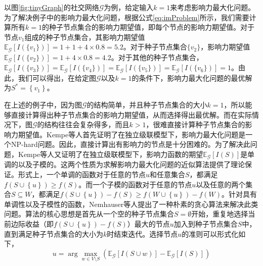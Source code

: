 以图\ref{fig:tinyGraph}的社交网络$\mathcal{G}$为例，给定输入$k=1$来考虑影响力最大化问题。为了解决例子中的影响力最大化问题，根据公式\ref{eq:imProblem}所示，我们需要计算所有$k=1$的种子节点集合的影响力期望值，即每个节点的影响力期望值。对于节点$v_1$组成的种子节点集合，其影响力期望值$\mathbb{E}_\mathcal{G}\left[I\left(\{v_1\}\right)\right]=1+1+4\times0.8=5.2$。对于种子节点集合$\{v_2\}$，影响力期望值$\mathbb{E}_\mathcal{G}\left[I\left(\{v_2\}\right)\right]=1+4\times0.8=4.2$。对于其他的种子节点集合，$\mathbb{E}_\mathcal{G}\left[I\left(\{v_3\}\right)\right]=
\mathbb{E}_\mathcal{G}\left[I\left(\{v_4\}\right)\right]=
\mathbb{E}_\mathcal{G}\left[I\left(\{v_5\}\right)\right]=
\mathbb{E}_\mathcal{G}\left[I\left(\{v_6\}\right)\right]=1$。由此，我们可以得出，在给定图$\mathcal{G}$以及$k=1$的条件下，影响力最大化问题的最优解为$S^\ast=\left\{v_1\right\}$。

在上述的例子中，因为图$\mathcal{G}$的结构简单，并且种子节点集合的大小$k=1$，所以能够直接计算得出种子节点集合的影响力期望值，从而选择得出最优解。而在实际情况下，图$\mathcal{G}$的结构往往会复杂得多，而且$k>1$，很难直接计算种子节点集合的影响力期望值。Kempe等人首先证明了在独立级联模型下，影响力最大化问题是一个NP-hard问题。因此，直接计算出有影响力的节点是十分困难的。为了解决此问题，Kempe等人又证明了在独立级联模型下，影响力函数的期望$\mathbb{E}_\mathcal{G}\left[I\left(S\right)\right]$是单调的以及子模的。这两个性质为求解影响力最大化问题的近似算法提供了理论保证。形式上，一个单调的函数对于任意的节点$u$和任意集合$S$，都满足$f\left(S\cup\left\{u\right\}\right) \geq f\left(S\right)$。而一个子模的函数对于任意的节点$u$以及任意的两个集合$S \subseteq W$，都满足$f\left(S\cup\left\{u\right\}\right) - f\left(S\right) \geq f\left(W\cup\left\{u\right\}\right) - f\left(W\right)$。针对具有单调性以及子模性的函数，Nemhauser等人提出了一种朴素的贪心算法来解决此类问题。算法的核心思想是首先从一个空的种子节点集合$S=\emptyset$开始，重复地选择当前边际收益（即$f\left(S\cup\left\{u\right\}\right) - f\left(S\right)$）最大的节点$u$加入到种子节点集合$S$中，直到满足种子节点集合的大小为$k$时结束迭代。选择节点$u$的准则可以形式化如下，
\begin{equation}
\label{eq:greedyIM}
    u=\arg\max\limits_{w \in V \setminus S}\left({\mathbb{E}_\mathcal{G}\left[I\left(S\cup w\right)\right]-\mathbb{E}_\mathcal{G}\left[I\left(S\right)\right]}\right)
\end{equation}

